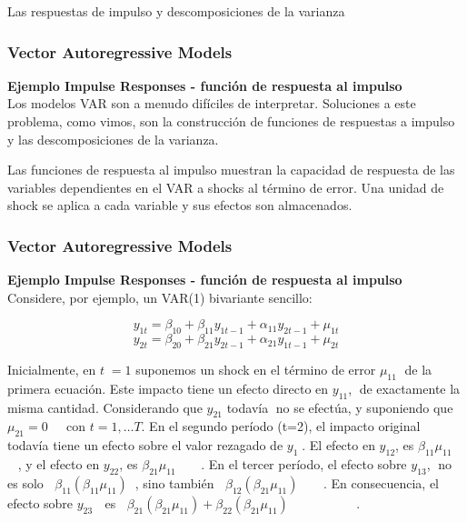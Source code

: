 \documentclass[spanish,xcolor=table]{beamer}
\begin{document}
\begin{section}{Las respuestas de impulso y descomposiciones de la varianza}
\begin{frame}
\frametitle{Vector Autoregressive Models}

\textbf{Ejemplo Impulse Responses - funci\'on de respuesta al impulso}\\

Los modelos VAR son a menudo dif\'{i}ciles de interpretar. Soluciones a este problema, como vimos, son la construcci\'on de funciones de respuestas a impulso y las descomposiciones de la varianza.

Las funciones de respuesta al impulso muestran la capacidad de respuesta de las variables dependientes en el VAR a shocks al t\'ermino de error. Una unidad de shock se aplica a cada variable y sus efectos son almacenados.

\end{frame}
\begin{frame}
\frametitle{Vector Autoregressive Models}

\textbf{Ejemplo Impulse Responses - funci\'on de respuesta al impulso}\\

Considere, por ejemplo, un VAR(1) bivariante sencillo:

\begin{equation*}
y_{1t} = \beta_{10} + \beta_{11} y_{1t-1} + \alpha_{11} y_{2t-1} + \mu_{1t}
\end{equation*}
\begin{equation*}
y_{2t} = \beta_{20} + \beta_{21} y_{2t-1} + \alpha_{21} y_{1t-1} + \mu_{2t}
\end{equation*}

Inicialmente, en $t 􏰃=1$ suponemos un shock en el t\'ermino de error $ \mu_{11}$􏰁 de la primera ecuaci\'on. Este impacto tiene un efecto directo en $y_{11}$,􏰁 de exactamente la misma cantidad. Considerando que $y_{21}$ todav\'{i}a􏰁 no se efect\'ua, y suponiendo que $\mu_{21}=0$􏰁􏰆􏰂􏰃 con $t=1, \dots T$. En el segundo per\'{i}odo (t=2), el impacto original todav\'{i}a tiene un efecto sobre el valor rezagado de $y_{1}$􏰁. El efecto en $y_{12}$, es $\beta_{11}\mu_{11}$􏰁􏰁􏰁, y el efecto en $y_{22}$, es $\beta_{21}\mu_{11}$􏰁􏰁􏰁􏰆􏰁􏰁􏰁. En el tercer per\'{i}odo, el efecto sobre $y_{13}$, 􏰞no es solo 􏰁􏰁$\beta_{11}(\beta_{11}\mu_{11})$􏰁􏰁, sino también 􏰁􏰁$\beta_{12}(\beta_{21}\mu_{11})$􏰁􏰆􏰗􏰆􏰁􏰁􏰘. En consecuencia, el efecto sobre $y_{23}$ 􏰞 es 􏰁􏰁$\beta_{21}(\beta_{21}\mu_{11})+\beta_{22}(\beta_{21}\mu_{11})$􏰁􏰁􏰆􏰁􏰗􏰆􏰁􏰁􏰁􏰘􏰆􏰆􏰗􏰆􏰆􏰗􏰆􏰁􏰁. 


\end{frame}
\end{section}
\end{document}
